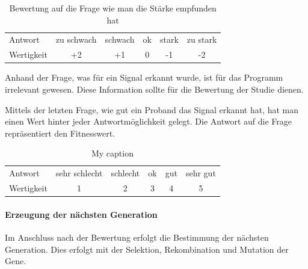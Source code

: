 \begin{table}[]
\centering
\caption{Bewertung auf die Frage wie man die St{\"a}rke empfunden hat}
\label{bewertungzdiagrammfrage}
\begin{tabular}{llllll}
Antwort   & zu schwach          & schwach               & ok                    & stark                   & zu stark              \\
Wertigkeit & \multicolumn{1}{c}{+2} & \multicolumn{1}{c}{+1} & \multicolumn{1}{c}{0} & \multicolumn{1}{c}{-1} & \multicolumn{1}{c}{-2}
\end{tabular}
\end{table}

Anhand der Frage, was f{\"u}r ein Signal erkannt wurde, ist f{\"u}r das Programm irrelevant gewesen. Diese Information sollte f{\"u}r die Bewertung der Studie dienen.

Mittels der letzten Frage, wie gut ein Proband das Signal erkannt hat, hat man einen Wert hinter jeder Antwortm{\"o}glichkeit gelegt. Die Antwort auf die Frage repr{\"a}sentiert den Fitnesswert. 

\begin{table}[]
\centering
\caption{My caption}
\label{my-label}
\begin{tabular}{llllll}
Antwort   & sehr schlecht          & schlecht               & ok                    & gut                   & sehr gut              \\
Wertigkeit & \multicolumn{1}{c}{1} & \multicolumn{1}{c}{2} & \multicolumn{1}{c}{3} & \multicolumn{1}{c}{4} & \multicolumn{1}{c}{5}
\end{tabular}
\end{table}

\paragraph{Erzeugung der n{\"a}chsten Generation}
Im Anschluss nach der Bewertung erfolgt die Bestimmung der n{\"a}chsten Generation. Dies erfolgt mit der Selektion, Rekombination und Mutation der Gene. 

